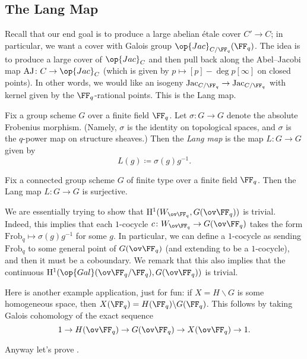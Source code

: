 \documentclass[../notes.tex]{subfiles}
\begin{document}
\subsection{The Lang Map}
Recall that our end goal is to produce a large abelian \'etale cover $C'\to C$; in particular, we want a cover with Galois group $\op{Jac}_{C/\FF_q}(\FF_q)$. The idea is to produce a large cover of $\op{Jac}_C$ and then pull back along the Abel--Jacobi map $\mathrm{AJ}\colon C\to\op{Jac}_C$ (which is given by $p\mapsto[p]-\deg p[\infty]$ on closed points). In other words, we would like an isogeny $\mathrm{Jac}_{C/\FF_q}\to\mathrm{Jac}_{C/\FF_q}$ with kernel given by the $\FF_q$-rational points. This is the Lang map.
\begin{definition}
	Fix a group scheme $G$ over a finite field $\FF_q$. Let $\sigma\colon G\to G$ denote the absolute Frobenius morphism. (Namely, $\sigma$ is the identity on topological spaces, and $\sigma$ is the $q$-power map on structure sheaves.) Then the \textit{Lang map} is the map $L\colon G\to G$ given by
	\[L(g)\coloneqq\sigma(g)g^{-1}.\]
\end{definition}
\begin{theorem}[Lang] \label{thm:lang}
	Fix a connected group scheme $G$ of finite type over a finite field $\FF_q$. Then the Lang map $L\colon G\to G$ is surjective.
\end{theorem}
\begin{remark}
	We are essentially trying to show that $\mathrm H^1(W_{\ov\FF_q},G(\ov\FF_q))$ is trivial. Indeed, this implies that each $1$-cocycle $c\colon W_{\ov\FF_q}\to G(\ov\FF_q)$ takes the form $\mathrm{Frob}_q\mapsto\sigma(g)g^{-1}$ for some $g$. In particular, we can define a $1$-cocycle as sending $\mathrm{Frob}_q$ to some general point of $G(\ov\FF_q)$ (and extending to be a $1$-cocycle), and then it must be a coboundary. We remark that this also implies that the continuous $\mathrm H^1(\op{Gal}(\ov\FF_q/\FF_q),G(\ov\FF_q))$ is trivial.
\end{remark}
\begin{remark}
	Here is another example application, just for fun: if $X=H\backslash G$ is some homogeneous space, then $X(\FF_q)=H(\FF_q)\backslash G(\FF_q)$. This follows by taking Galois cohomology of the exact sequence
	\[1\to H(\ov\FF_q)\to G(\ov\FF_q)\to X(\ov\FF_q)\to1.\]
\end{remark}
Anyway let's prove .
\end{document}
